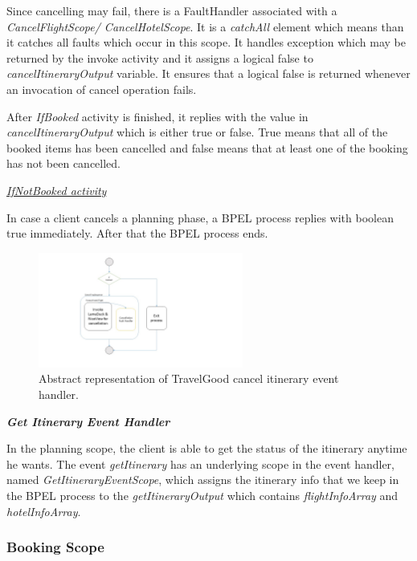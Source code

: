 Since cancelling may fail, there is a FaultHandler associated with a \textit{CancelFlightScope/ CancelHotelScope}. It is a \textit{catchAll} element which means than it catches all faults which occur in this scope. It handles exception which may be returned by the invoke activity and it assigns a logical false to \textit{cancelItineraryOutput} variable. It ensures that a logical false is returned whenever an invocation of cancel operation fails. 

After \textit{IfBooked} activity is finished, it replies with the value in \textit{cancelItineraryOutput} which is either true or false. True means that all of the booked items has been cancelled and false means that at least one of the booking has not been cancelled.

\underline{\textit{IfNotBooked activity}}

In case a client cancels a planning phase, a BPEL process replies with boolean true immediately. After that the BPEL process ends.

\begin{figure}[H]
\centering
\includegraphics[width=0.6\textwidth]{images/bpel_cancel_abstract_impl.jpg}
\caption{Abstract representation of TravelGood cancel itinerary event handler.} \label{fig:abstract-cancel}
\label{statediagram}
\end{figure}

\textbf{\textit{Get Itinerary Event Handler}}

In the planning scope, the client is able to get the status of the itinerary anytime he wants. The event \textit{getItinerary} has an underlying scope in the event handler, named \textit{GetItineraryEventScope}, which assigns the itinerary info that we keep in the BPEL process to the \textit{getItineraryOutput} which contains \textit{flightInfoArray} and \textit{hotelInfoArray}.

\subsubsection*{Booking Scope}

